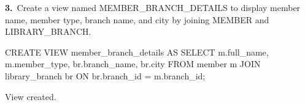 \noindent\begin{minipage}{\linewidth}
\begingroup{}
{\fontsize{14}{17}\selectfont\textbf{3.}}\ Create a view named MEMBER\_BRANCH\_DETAILS to display member name, member type, branch name, and city by joining MEMBER and LIBRARY\_BRANCH.\par
\endgroup\vspace{12pt}


\begin{sqlcode}
CREATE VIEW member_branch_details AS
SELECT m.full_name, m.member_type, br.branch_name, br.city
FROM member m
JOIN library_branch br ON br.branch_id = m.branch_id;
\end{sqlcode}

\vspace{18pt}


\begin{sqlout}[fontsize=\small]
View created.
\end{sqlout}
\end{minipage}\par\vspace{24pt}

